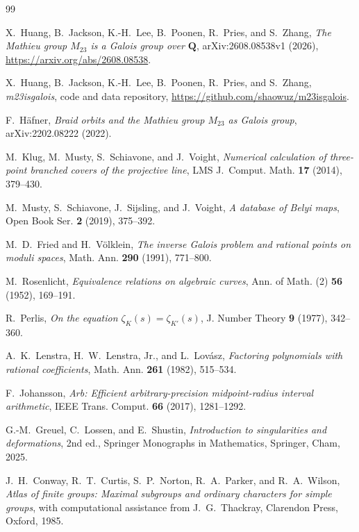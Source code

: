 \documentclass[11pt]{amsart}
\theoremstyle{definition}
\theoremstyle{remark}
\newcommand{\QQ}{\mathbf Q}
\begin{document}
\renewcommand{\bibliofont}{\small}
\begin{thebibliography}{99}

X.~Huang, B.~Jackson, K.-H.~Lee, B.~Poonen, R.~Pries, and S.~Zhang,
\emph{The Mathieu group $M_{23}$ is a Galois group over $\QQ$},
arXiv:2608.08538v1 (2026),
\url{https://arxiv.org/abs/2608.08538}.

X.~Huang, B.~Jackson, K.-H.~Lee, B.~Poonen, R.~Pries, and S.~Zhang,
\emph{m23isgalois}, code and data repository,
\url{https://github.com/shaowuz/m23isgalois}.

F.~H\"afner,
\emph{Braid orbits and the Mathieu group $M_{23}$ as Galois group},
arXiv:2202.08222 (2022).

M.~Klug, M.~Musty, S.~Schiavone, and J.~Voight,
\emph{Numerical calculation of three-point branched covers of the
projective line},
LMS J.~Comput. Math. \textbf{17} (2014), 379--430.

M.~Musty, S.~Schiavone, J.~Sijsling, and J.~Voight,
\emph{A database of Belyi maps},
Open Book Ser. \textbf{2} (2019), 375--392.

M.~D.~Fried and H.~V\"olklein,
\emph{The inverse Galois problem and rational points on moduli spaces},
Math. Ann. \textbf{290} (1991), 771--800.

M.~Rosenlicht,
\emph{Equivalence relations on algebraic curves},
Ann. of Math. (2) \textbf{56} (1952), 169--191.

R.~Perlis,
\emph{On the equation $\zeta_K(s)=\zeta_{K'}(s)$},
J. Number Theory \textbf{9} (1977), 342--360.

A.~K.~Lenstra, H.~W.~Lenstra, Jr., and L.~Lov\'asz,
\emph{Factoring polynomials with rational coefficients},
Math. Ann. \textbf{261} (1982), 515--534.

F.~Johansson,
\emph{Arb: Efficient arbitrary-precision midpoint-radius interval arithmetic},
IEEE Trans. Comput. \textbf{66} (2017), 1281--1292.

G.-M.~Greuel, C.~Lossen, and E.~Shustin,
\emph{Introduction to singularities and deformations}, 2nd ed.,
Springer Monographs in Mathematics, Springer, Cham, 2025.

J.~H.~Conway, R.~T.~Curtis, S.~P.~Norton, R.~A.~Parker, and R.~A.~Wilson,
\emph{Atlas of finite groups: Maximal subgroups and ordinary characters for
simple groups}, with computational assistance from J.~G.~Thackray,
Clarendon Press, Oxford, 1985.


\end{thebibliography}
\end{document}
